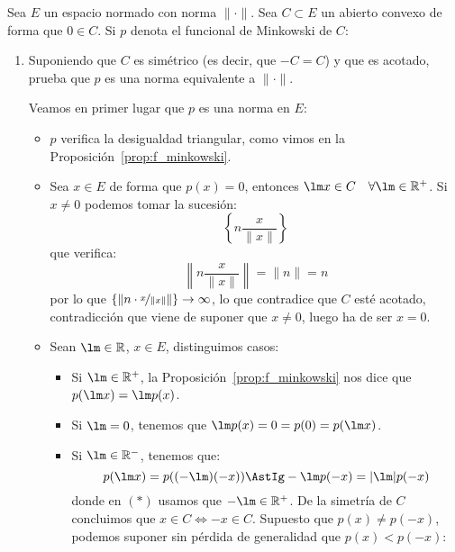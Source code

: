 \begin{ejercicio}
    Sea $E$ un espacio normado con norma $\|\cdot \|$. Sea $C\subset E$ un abierto convexo de forma que $0\in C$. Si $p$ denota el funcional de Minkowski de $C$:
    \begin{enumerate}[label=\alph*)]
        \item Suponiendo que $C$ es simétrico (es decir, que $-C=C$) y que es acotado, prueba que $p$ es una norma equivalente a $\|\cdot \|$.

            Veamos en primer lugar que $p$ es una norma en $E$:
            \begin{itemize}
                \item $p$ verifica la desigualdad triangular, como vimos en la Proposición~\ref{prop:f_minkowski}.
                \item Sea $x\in E$ de forma que $p(x) = 0$, entonces $\lm x\in C \quad \forall \lm \in \mathbb{R}^+$. Si $x\neq 0$ podemos tomar la sucesión:
                    \begin{equation*}
                        \left\{n \frac{x}{\|x\|}\right\}
                    \end{equation*}
                    que verifica:
                    \begin{equation*}
                        \left\|n\frac{x}{\|x\|}\right\| = \|n\| = n 
                    \end{equation*}
                    por lo que $\{\|n\cdot \nicefrac{x}{\|x\|}\|\}\to \infty$, lo que contradice que $C$ esté acotado, contradicción que viene de suponer que $x\neq 0$, luego ha de ser $x = 0$.
                \item Sean $\lm \in \mathbb{R}$, $x\in E$, distinguimos casos:
                    \begin{itemize}
                        \item Si $\lm \in \mathbb{R}^+$, la Proposición~\ref{prop:f_minkowski} nos dice que $p(\lm x) = \lm p(x)$.
                        \item Si $\lm  = 0$, tenemos que $\lm p(x) = 0 = p(0) = p(\lm x)$.
                        \item Si $\lm\in \mathbb{R}^-$, tenemos que:
                            \begin{equation*}
                                p(\lm x) = p((-\lm)(-x)) \AstIg -\lm p(-x) = |\lm| p(-x)
                            \end{equation*}
                            donde en $(\ast)$ usamos que $-\lm\in \mathbb{R}^+$. De la simetría de $C$ concluimos que $x\in C\Longleftrightarrow -x\in C$. Supuesto que $p(x) \neq p(-x)$, podemos suponer sin pérdida de generalidad que $p(x)<p(-x)$:

\end{itemize}
\end{itemize}
\end{enumerate}
\end{ejercicio}
